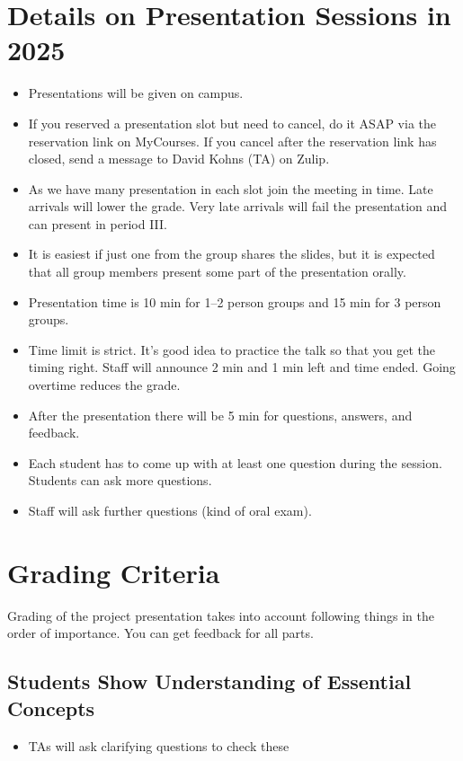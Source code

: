 \documentclass[11pt,a4paper]{article}
\begin{document}
\section{Details on Presentation Sessions in 2025}

\begin{itemize}
    \item Presentations will be given on campus.
    \item If you reserved a presentation slot but need to cancel, do it ASAP via the reservation link on MyCourses. If you cancel after the reservation link has closed, send a message to David Kohns (TA) on Zulip.
    \item As we have many presentation in each slot join the meeting in time. Late arrivals will lower the grade. Very late arrivals will fail the presentation and can present in period III.
    \item It is easiest if just one from the group shares the slides, but it is expected that all group members present some part of the presentation orally.
    \item Presentation time is 10 min for 1--2 person groups and 15 min for 3 person groups.
    \item Time limit is strict. It's good idea to practice the talk so that you get the timing right. Staff will announce 2 min and 1 min left and time ended. Going overtime reduces the grade.
    \item After the presentation there will be 5 min for questions, answers, and feedback.
    \item Each student has to come up with at least one question during the session. Students can ask more questions.
    \item Staff will ask further questions (kind of oral exam).
\end{itemize}

\section{Grading Criteria}

Grading of the project presentation takes into account following things in the order of importance. You can get feedback for all parts.

\subsection{Students Show Understanding of Essential Concepts}
\begin{itemize}[label=--]
    \item TAs will ask clarifying questions to check these
\end{itemize}
\end{document}
